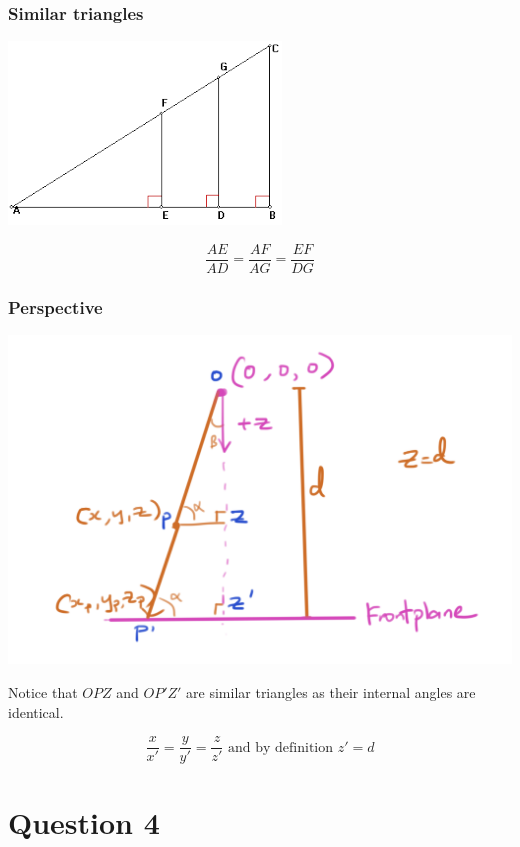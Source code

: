 \documentclass{beamer}
\begin{document}
\begin{frame}
    \frametitle{Similar triangles}

    \begin{center}
        \includegraphics[scale=0.8]{similar-tris.png}
    \end{center}

    $$
    \frac{AE}{AD} = \frac{AF}{AG} = \frac{EF}{DG}
    $$

\end{frame}

\begin{frame}
    \frametitle{Perspective}

    \begin{center}
        \includegraphics[scale=0.3]{q3-similar-tris.png}
    \end{center}

    Notice that $OPZ$ and $OP'Z'$ are similar triangles as their internal angles are identical.

    $$
    \frac{x}{x'} = \frac{y}{y'} = \frac{z}{z'} \text{ and by definition } z' = d
    $$

\end{frame}

\section{Question 4}
\end{document}
